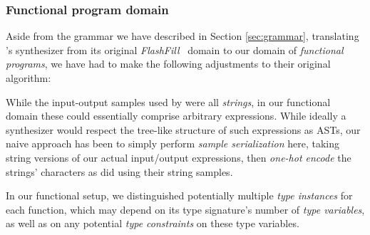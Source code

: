 \documentclass{article}
\begin{document}


\subsubsection{Functional program domain} \label{sec:fp}

Aside from the grammar we have described in Section \ref{sec:grammar},
translating \citet{nsps}'s synthesizer from its original \emph{FlashFill}~\citep{prose} domain to our domain of \emph{functional programs},
we have had to make the following adjustments to their original algorithm:

    While the input-output samples used by \citet{nsps} were all \emph{strings},
    in our functional domain these could essentially comprise arbitrary expressions.
    While ideally a synthesizer would respect the tree-like structure of such expressions as ASTs,
    our naive approach has been to simply perform \emph{sample serialization} here,
    taking string versions of our actual input/output expressions,
    then \emph{one-hot encode} the strings' characters as \citet{nsps} did using their string samples.

    In our functional setup,
    we distinguished potentially multiple \emph{type instances} for each function,
    which may depend on its type signature's number of \emph{type variables},
    as well as on any potential \emph{type constraints} on these type variables.

\end{document}
